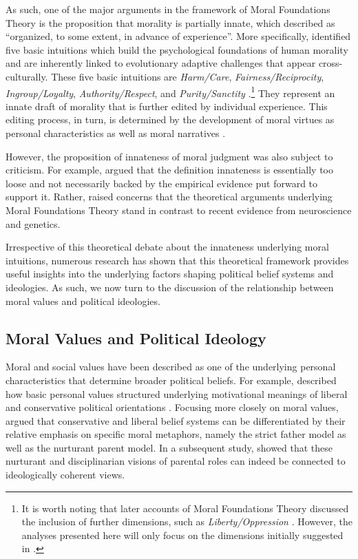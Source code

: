 \documentclass[12pt]{article}
\begin{document}
As such, one of the major arguments in the framework of Moral Foundations Theory is the proposition that morality is partially innate, which \citet[367]{haidt2008moral} described as ``organized, to some extent, in advance of experience''. More specifically, \citet{haidt2008moral} identified five basic intuitions which build the psychological foundations of human morality and are inherently linked to evolutionary adaptive challenges that appear cross-culturally. These five basic intuitions are \textit{Harm/Care}, \textit{Fairness/Reciprocity}, \textit{Ingroup/Loyalty}, \textit{Authority/Respect}, and \textit{Purity/Sanctity} \citep[see also][]{graham2011mapping}.\footnote{It is worth noting that later accounts of Moral Foundations Theory discussed the inclusion of further dimensions, such as \textit{Liberty/Oppression} \citep[c.f.][]{graham2013moral,haidt2012righteous}. However, the analyses presented here will only focus on the dimensions initially suggested in \citet{haidt2008moral}.} They represent an innate draft of morality that is further edited by individual experience. This editing process, in turn, is determined by the development of moral virtues as personal characteristics as well as moral narratives \citep{haidt2008moral}.

However, the proposition of innateness of moral judgment was also subject to criticism. For example, \citet{suhler2011can} argued that the definition innateness is essentially too loose and not necessarily backed by the empirical evidence put forward to support it. Rather, \citet{suhler2011can} raised concerns that the theoretical arguments underlying Moral Foundations Theory stand in contrast to recent evidence from neuroscience and genetics.

Irrespective of this theoretical debate about the innateness underlying moral intuitions, numerous research has shown that this theoretical framework provides useful insights into the underlying factors shaping political belief systems and ideologies. As such, we now turn to the discussion of the relationship between moral values and political ideologies.


\subsection{Moral Values and Political Ideology}

Moral and social values have been described as one of the underlying personal characteristics that determine broader political beliefs. For example, \citet{piurko2011basic} described how basic personal values structured underlying motivational meanings of liberal and conservative political orientations \citep[see also][]{schwartz2010basic,schwartz2011basic}. Focusing more closely on moral values, \citet{lakoff1995metaphor} argued that conservative and liberal belief systems can be differentiated by their relative emphasis on specific moral metaphors, namely the strict father model as well as the nurturant parent model. In a subsequent study, \citet{barker2006competing} showed that these nurturant and disciplinarian visions of parental roles can indeed be connected to ideologically coherent views.
\end{document}
